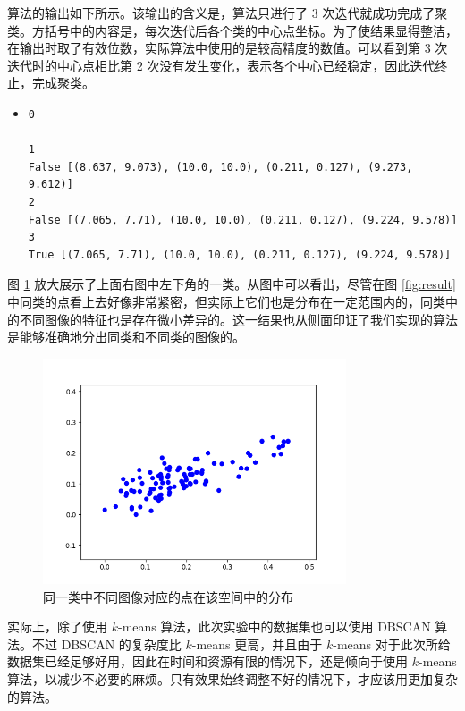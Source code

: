 \documentclass[a4paper, 12pt]{article}
\begin{document}
\newpage
算法的输出如下所示。该输出的含义是，算法只进行了 3 次迭代就成功完成了聚类。方括号中的内容是，每次迭代后各个类的中心点坐标。为了使结果显得整洁，在输出时取了有效位数，实际算法中使用的是较高精度的数值。可以看到第 3 次迭代时的中心点相比第 2 次没有发生变化，表示各个中心已经稳定，因此迭代终止，完成聚类。

\begin{itemize}[label={},leftmargin=2em]
\item \begin{lstlisting}[style=plainText,caption={算法的输出}]
0

1
False [(8.637, 9.073), (10.0, 10.0), (0.211, 0.127), (9.273, 9.612)]
2
False [(7.065, 7.71), (10.0, 10.0), (0.211, 0.127), (9.224, 9.578)]
3
True [(7.065, 7.71), (10.0, 10.0), (0.211, 0.127), (9.224, 9.578)]
\end{lstlisting}
\end{itemize}

图 \ref{fig:zoom} 放大展示了上面右图中左下角的一类。从图中可以看出，尽管在图 \ref{fig:result} 中同类的点看上去好像非常紧密，但实际上它们也是分布在一定范围内的，同类中的不同图像的特征也是存在微小差异的。这一结果也从侧面印证了我们实现的算法是能够准确地分出同类和不同类的图像的。

\begin{figure}[htbp]
    \centering
    \includegraphics[width=0.8\textwidth]{./images/clustered_zoom.png}
    \caption{同一类中不同图像对应的点在该空间中的分布}
    \label{fig:zoom}
\end{figure}

实际上，除了使用 $k$-means 算法，此次实验中的数据集也可以使用 DBSCAN 算法。不过 DBSCAN 的复杂度比 $k$-means 更高，并且由于 $k$-means 对于此次所给数据集已经足够好用，因此在时间和资源有限的情况下，还是倾向于使用 $k$-means 算法，以减少不必要的麻烦。只有效果始终调整不好的情况下，才应该用更加复杂的算法。
\end{document}
